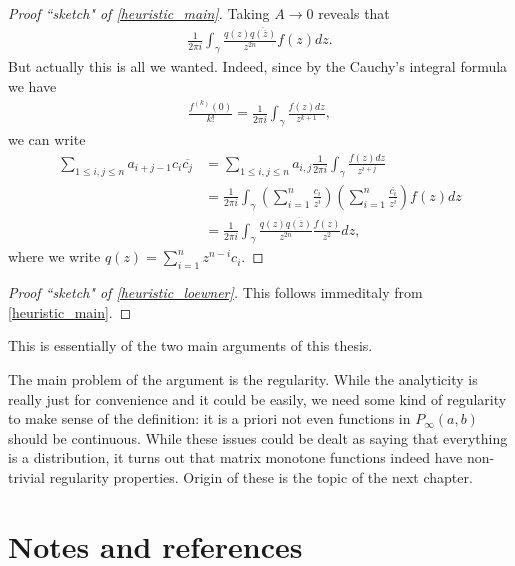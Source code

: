\begin{proof}[Proof ``sketch" of \ref{heuristic_main}]
	Taking $A \to 0$ reveals that
	\begin{align*}
		\frac{1}{2 \pi i}\int_{\gamma} \frac{q(z) \overline{q(\overline{z})}}{z^{2 n}} f(z) dz.
	\end{align*}
	But actually this is all we wanted. Indeed, since by the Cauchy's integral formula we have
	\begin{align*}
		\frac{f^{(k)}(0)}{k!} = \frac{1}{2 \pi i} \int_{\gamma} \frac{f(z) d z}{z^{k + 1}},
	\end{align*}
	we can write
	\begin{align*}
		\sum_{1 \leq i, j \leq n} a_{i + j - 1} c_{i} \overline{c_{j}} &= \sum_{1 \leq i, j \leq n} a_{i, j} \frac{1}{2 \pi i} \int_{\gamma} \frac{f(z) d z}{z^{i + j}} \\
		&= \frac{1}{2 \pi i} \int_{\gamma} \left(\sum_{i = 1}^{n} \frac{c_{i}}{z^{i}} \right) \left(\sum_{i = 1}^{n} \frac{\overline{c_{i}}}{z^{i}} \right)f(z) dz \\
		&= \frac{1}{2 \pi i} \int_{\gamma}  \frac{q(z) \overline{q(\overline{z})}}{z^{2 n}} \frac{f(z)}{z^2} dz,
	\end{align*}
	where we write $q(z) = \sum_{i = 1}^{n} z^{n - i} c_{i}$.
\end{proof}

\begin{proof}[Proof ``sketch" of \ref{heuristic_loewner}]
	This follows immeditaly from \ref{heuristic_main}.
\end{proof}

This is essentially of the two main arguments of this thesis.

The main problem of the argument is the regularity. While the analyticity is really just for convenience and it could be easily, we need some kind of regularity to make sense of the definition: it is a priori not even functions in $P_{\infty}(a, b)$ should be continuous. While these issues could be dealt as saying that everything is a distribution, it turns out that matrix monotone functions indeed have non-trivial regularity properties. Origin of these is the topic of the next chapter.


\section{Notes and references}
